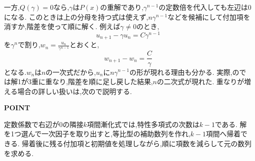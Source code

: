 一方,$Q(\gamma)=0$なら,$\gamma$は$P(x)$の重解であり,$\gamma^{n-1}$の定数倍を代入しても左辺は0になる.
このときは上の分母を持つ式は使えず,$n\gamma^{n-1}$などを候補にして付加項を消すか,階差を使って順に解く.
例えば$\gamma\ne0$のとき,
\[
  u_{n+1}-\gamma u_n=C\gamma^{n-1}
\]
を$\gamma^n$で割り,$w_n=\frac{u_n}{\gamma^{n-1}}$とおくと,
\[
  w_{n+1}-w_n=\frac{C}{\gamma}
\]
となる.$w_n$は$n$の一次式だから,$u_n$に$n\gamma^{n-1}$の形が現れる理由も分かる.
実際,のでは解1が3重に重なり,階差を順に足し戻した結果,$n$の二次式が現れた.
重なりが増える場合の詳しい扱いは,次ので説明する.

\begin{bookpoint}
  \textbf{POINT}\par
  定数係数で右辺が0の隣接$k$項間漸化式では,特性多項式の次数は$k-1$である.
  解を1つ選んで一次因子を取り出すと,等比型の補助数列を作れ,$k-1$項間へ帰着できる.
  帰着後に残る付加項と初期値を処理しながら,順に項数を減らして元の数列を求める.
\end{bookpoint}
